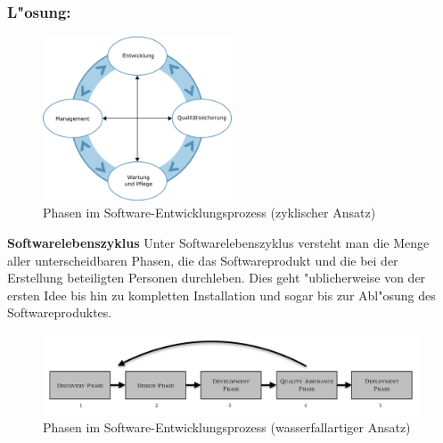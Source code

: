 \subsubsection*{L"osung:}
\begin{figure}[H]
  \centering
  \includegraphics[width=0.5\textwidth]{./images/AbbEntwicklgProzess.png}
  \captionsetup{name=Abb.,font=footnotesize}
  \caption{Phasen im Software-Entwicklungsprozess (zyklischer Ansatz)}
\end{figure}

\begin{defi}
  \textbf{Softwarelebenszyklus}
  \smallbreak
  Unter Softwarelebenszyklus versteht man die Menge aller unterscheidbaren Phasen, die das Softwareprodukt und die bei der Erstellung beteiligten Personen durchleben. Dies geht "ublicherweise von der ersten Idee bis hin zu kompletten Installation und sogar bis zur Abl"osung des Softwareproduktes.
\end{defi}
\smallbreak
\newpage
\begin{figure}[H]
  \centering
  \includegraphics[width=1\textwidth]{./images/Softwarezyklus.png}
  \captionsetup{name=Abb.,font=footnotesize}
  \caption{Phasen im Software-Entwicklungsprozess (wasserfallartiger Ansatz)}
\end{figure}

